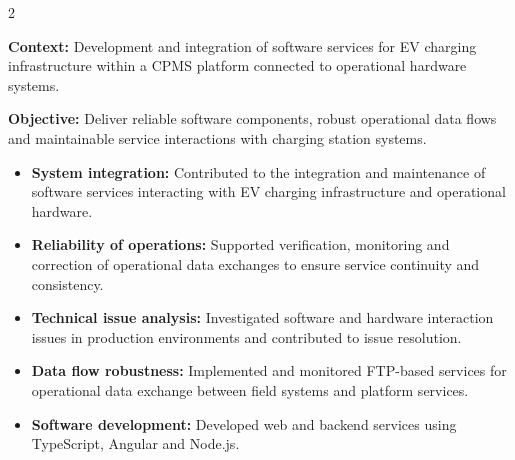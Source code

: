 \documentclass[8pt,a4paper,ragged2e,withhyper]{altacv}
\begin{document}



\makecvheader

\vspace{-0.3cm}


\begin{paracol}{2}



\textbf{Context:} Development and integration of software services for EV charging infrastructure within a CPMS platform connected to operational hardware systems.

\textbf{Objective:} Deliver reliable software components, robust operational data flows and maintainable service interactions with charging station systems.

\begin{itemize}
\item \textbf{System integration:} Contributed to the integration and maintenance of software services interacting with EV charging infrastructure and operational hardware.
\item \textbf{Reliability of operations:} Supported verification, monitoring and correction of operational data exchanges to ensure service continuity and consistency.
\item \textbf{Technical issue analysis:} Investigated software and hardware interaction issues in production environments and contributed to issue resolution.
\item \textbf{Data flow robustness:} Implemented and monitored FTP-based services for operational data exchange between field systems and platform services.
\item \textbf{Software development:} Developed web and backend services using TypeScript, Angular and Node.js.
\end{itemize}


\end{paracol}
\end{document}
